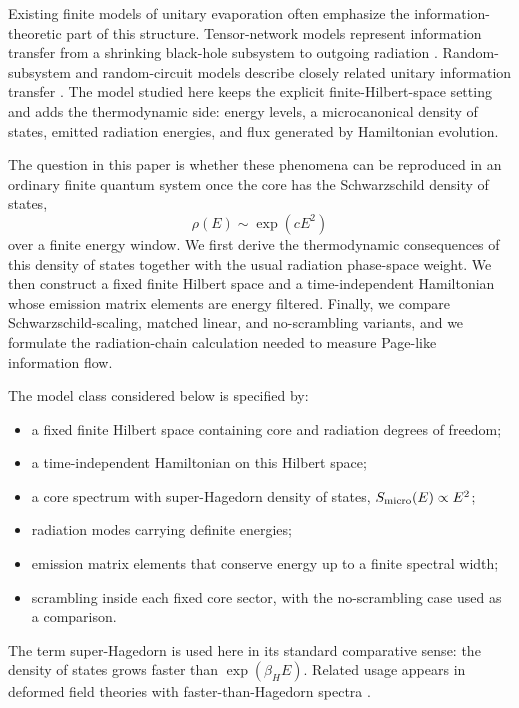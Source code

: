 \documentclass[12pt]{article}
\newcommand{\Smicro}{S_{\rm micro}}
\begin{document}
Existing finite models of unitary evaporation often emphasize the
information-theoretic part of this structure.  Tensor-network models represent
information transfer from a shrinking black-hole subsystem to outgoing
radiation \cite{LeutheusserVanRaamsdonk2017}.  Random-subsystem and
random-circuit models describe closely related unitary information transfer
\cite{HaydenPreskill2007,PiroliSunderhaufQi2020}.
The model studied here keeps the explicit finite-Hilbert-space setting and
adds the thermodynamic side: energy levels, a microcanonical density of states,
emitted radiation energies, and flux generated by Hamiltonian evolution.

The question in this paper is whether these phenomena can be reproduced in an
ordinary finite quantum system once the core has the Schwarzschild density of
states,
\begin{equation}
    \rho(E)\sim \exp(cE^2)
\end{equation}
over a finite energy window.  We first derive the thermodynamic consequences
of this density of states together with the usual radiation phase-space
weight.  We then construct a fixed finite Hilbert space and a time-independent
Hamiltonian whose emission matrix elements are energy filtered.  Finally, we
compare Schwarzschild-scaling, matched linear, and no-scrambling variants, and
we formulate the radiation-chain calculation needed to measure Page-like
information flow.

The model class considered below is specified by:
\begin{itemize}
    \item a fixed finite Hilbert space containing core and radiation degrees of
    freedom;
    \item a time-independent Hamiltonian on this Hilbert space;
    \item a core spectrum with super-Hagedorn density of states,
    $\Smicro(E)\propto E^2$;
    \item radiation modes carrying definite energies;
    \item emission matrix elements that conserve energy up to a finite
    spectral width;
    \item scrambling inside each fixed core sector, with the
    no-scrambling case used as a comparison.
\end{itemize}
The term super-Hagedorn is used here in its standard comparative sense:
the density of states grows faster than $\exp(\beta_H E)$.  Related usage
appears in deformed field theories with faster-than-Hagedorn spectra
\cite{LeFlochMezei2019}.
\end{document}
